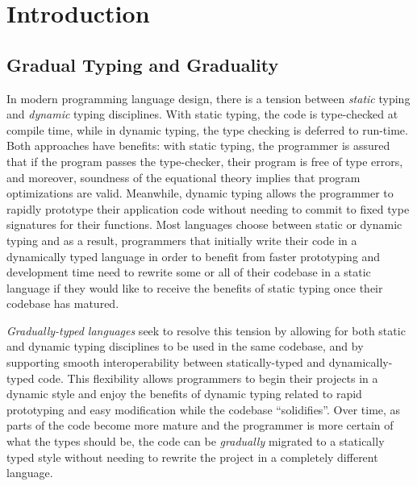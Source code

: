 \section{Introduction}
  
\subsection{Gradual Typing and Graduality}
In modern programming language design, there is a tension between \emph{static} typing
and \emph{dynamic} typing disciplines.
With static typing, the code is type-checked at compile time, while in dynamic typing,
the type checking is deferred to run-time. Both approaches have benefits: with static 
typing, the programmer is assured that if the program passes the type-checker, their
program is free of type errors, and moreover, soundness of the equational theory implies
that program optimizations are valid.
Meanwhile, dynamic typing allows the programmer to rapidly prototype
their application code without needing to commit to fixed type signatures for their
functions. Most languages choose between static or dynamic typing and as a result, programmers that initially write their code in a dynamically typed language
in order to benefit from faster prototyping and development time need to rewrite
some or all of their codebase in a static language if they would like to receive the benefits of static
typing once their codebase has matured.

\emph{Gradually-typed languages} \cite{siek-taha06, tobin-hochstadt06} seek to resolve this tension
by allowing for both static and dynamic typing disciplines to be used in the same codebase,
and by supporting smooth interoperability between statically-typed and dynamically-typed code.
This flexibility allows programmers to begin their projects in a dynamic style and
enjoy the benefits of dynamic typing related to rapid prototyping and easy modification
while the codebase ``solidifies''. Over time, as parts of the code become more mature
and the programmer is more certain of what the types should be, the code can be
\emph{gradually} migrated to a statically typed style without needing to
rewrite the project in a completely different language.


